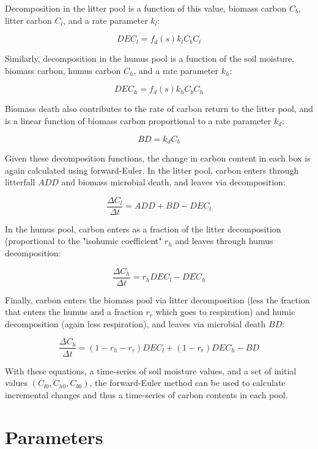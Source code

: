 \documentclass[12pt, letterpaper]{article}
\begin{document}
Decomposition in the litter pool is a function of this value, biomass carbon $C_b$, litter carbon $C_l$, and a rate parameter $k_l$:

$$ DEC_l = f_d(s) k_l C_b C_l $$

Similarly, decomposition in the humus pool is a function of the soil moisture, biomass carbon, humus carbon $C_h$, and a rate parameter $k_h$:

$$ DEC_h = f_d(s) k_h C_b C_h $$

Biomass death also contributes to the rate of carbon return to the litter pool, and is a linear function of biomass carbon proportional to a rate parameter $k_d$:

$$ BD = k_d C_b $$

Given these decomposition functions, the change in carbon content in each box is again calculated using forward-Euler. In the litter pool, carbon enters through litterfall $ADD$ and biomass microbial death, and leaves via decomposition:

$$ \frac{\Delta C_l}{\Delta t} =  ADD + BD - DEC_l  $$

In the humus pool, carbon enters as a fraction of the litter decomposition (proportional to the "isohumic coefficient" $r_h$ and leaves through humus decomposition:

$$ \frac{\Delta C_h}{\Delta t} = r_h DEC_l - DEC_h $$

Finally, carbon enters the biomass pool via litter decomposition (less the fraction that enters the humus and a fraction $r_r$ which goes to respiration) and humic decomposition (again less respiration), and leaves via microbial death $BD$:

$$ \frac{\Delta C_b}{\Delta t} = (1-r_h-r_r)DEC_l + (1-r_r)DEC_h - BD $$

With these equations, a time-series of soil moisture values, and a set of initial values $(C_{l0}, C_{h0}, C_{b0})$, the forward-Euler method can be used to calculate incremental changes and thus a time-series of carbon contents in each pool.

\section{Parameters}
\end{document}
